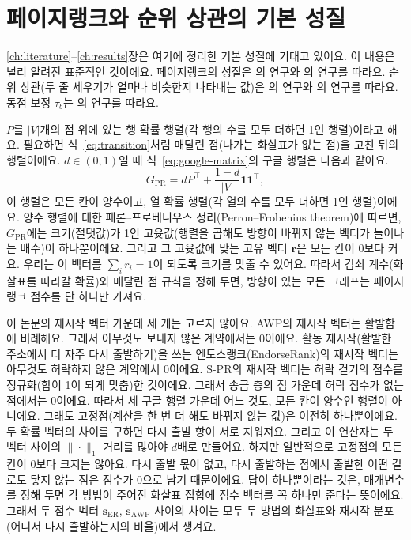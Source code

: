 \section{페이지랭크와 순위 상관의 기본 성질}
\label{ch:appendix-theory}

\ref{ch:literature}--\ref{ch:results}장은 여기에 정리한 기본 성질에 기대고 있어요. 이 내용은 널리 알려진 표준적인 것이에요. 페이지랭크의 성질은 \textcite{page1999pagerank}의 연구와 \textcite{langville2006pagerank}의 연구를 따라요. 순위 상관(두 줄 세우기가 얼마나 비슷한지 나타내는 값)은 \textcite{spearman1904proof}의 연구와 \textcite{kendall1938rank}의 연구를 따라요. 동점 보정 $\tau_b$는 \textcite{kendall1945ties}의 연구를 따라요.


$P$를 $|V|$개의 점 위에 있는 행 확률 행렬(각 행의 수를 모두 더하면 1인 행렬)이라고 해요. 필요하면 식~\eqref{eq:transition}처럼 매달린 점(나가는 화살표가 없는 점)을 고친 뒤의 행렬이에요. $d\in(0,1)$일 때 식~\eqref{eq:google-matrix}의 구글 행렬은 다음과 같아요.
\[
G_{\mathrm{PR}}=d P^{\top}+\frac{1-d}{|V|}\mathbf{1}\mathbf{1}^{\top},
\]
이 행렬은 모든 칸이 양수이고, 열 확률 행렬(각 열의 수를 모두 더하면 1인 행렬)이에요. 양수 행렬에 대한 페론--프로베니우스 정리(Perron--Frobenius theorem)에 따르면, $G_{\mathrm{PR}}$에는 크기(절댓값)가 1인 고윳값(행렬을 곱해도 방향이 바뀌지 않는 벡터가 늘어나는 배수)이 하나뿐이에요. 그리고 그 고윳값에 맞는 고유 벡터 $\mathbf{r}$은 모든 칸이 0보다 커요. 우리는 이 벡터를 $\sum_i r_i=1$이 되도록 크기를 맞출 수 있어요. 따라서 감쇠 계수(화살표를 따라갈 확률)와 매달린 점 규칙을 정해 두면, 방향이 있는 모든 그래프는 페이지랭크 점수를 단 하나만 가져요\parencite{langville2006pagerank}.

이 논문의 재시작 벡터 가운데 세 개는 고르지 않아요. AWP의 재시작 벡터는 활발함에 비례해요. 그래서 아무것도 보내지 않은 계약에서는 0이에요. 활동 재시작(활발한 주소에서 더 자주 다시 출발하기)을 쓰는 엔도스랭크(EndorseRank)의 재시작 벡터는 아무것도 허락하지 않은 계약에서 0이에요. \mbox{S-PR}의 재시작 벡터는 허락 걷기의 점수를 정규화(합이 1이 되게 맞춤)한 것이에요. 그래서 송금 층의 점 가운데 허락 점수가 없는 점에서는 0이에요. 따라서 세 구글 행렬 가운데 어느 것도, 모든 칸이 양수인 행렬이 아니에요. 그래도 고정점(계산을 한 번 더 해도 바뀌지 않는 값)은 여전히 하나뿐이에요. 두 확률 벡터의 차이를 구하면 다시 출발 항이 서로 지워져요. 그리고 이 연산자는 두 벡터 사이의 $\|\cdot\|_1$ 거리를 많아야 $d$배로 만들어요. 하지만 일반적으로 고정점의 모든 칸이 0보다 크지는 않아요. 다시 출발 몫이 없고, 다시 출발하는 점에서 출발한 어떤 길로도 닿지 않는 점은 점수가 0으로 남기 때문이에요. 답이 하나뿐이라는 것은, 매개변수를 정해 두면 각 방법이 주어진 화살표 집합에 점수 벡터를 꼭 하나만 준다는 뜻이에요. 그래서 두 점수 벡터 $\mathbf{s}_{\mathrm{ER}}$, $\mathbf{s}_{\mathrm{AWP}}$ 사이의 차이는 모두 두 방법의 화살표와 재시작 분포(어디서 다시 출발하는지의 비율)에서 생겨요.

